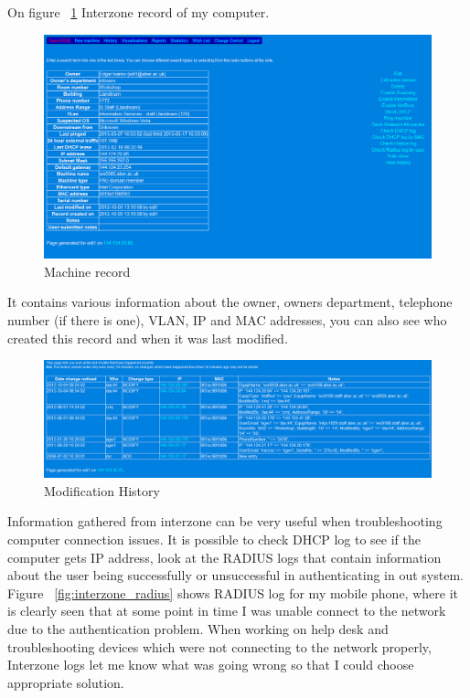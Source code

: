 \documentclass[10pt,a4paper,headinclude=true]{report}
\begin{document}
On figure ~\ref{fig:machine_record} Interzone record of my computer.

\begin{figure}[H]
\centering
\centerline{\includegraphics[scale=0.5]{./machine_record}}
\caption{Machine record}
\label{fig:machine_record}
\end{figure}

It contains various information about the owner, owners department, telephone number (if there is one), VLAN, IP and MAC addresses, you can also see who created this record and when it was last modified.

\begin{figure}[H]
\centering
\centerline{\includegraphics[scale=0.5]{./modification_history}}
\caption{Modification History}
\label{fig:modification_history}
\end{figure}

Information gathered from interzone can be very useful when troubleshooting computer connection issues. It is possible to check DHCP log to see if the computer gets IP address, look at the RADIUS logs that contain information about the user being successfully or unsuccessful in authenticating in out system. Figure ~\ref{fig:interzone_radius} shows RADIUS log for my mobile phone, where it is clearly seen that at some point in time I was unable connect to the network due to the authentication problem. When working on help desk and troubleshooting devices which were not connecting to the network properly, Interzone logs let me know what was going wrong so that I could choose appropriate solution. 
\end{document}
